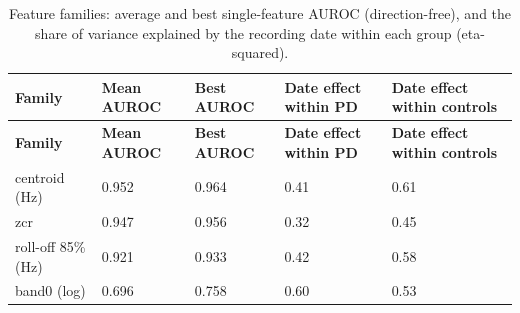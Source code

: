 \documentclass[11pt,a4paper]{article}
\begin{document}
\begin{center}\small\renewcommand{\arraystretch}{1.15}
\begin{longtable}{>{\raggedright\arraybackslash}p{2.88cm}>{\raggedleft\arraybackslash}p{2.88cm}>{\raggedleft\arraybackslash}p{2.88cm}>{\raggedleft\arraybackslash}p{2.88cm}>{\raggedleft\arraybackslash}p{2.88cm}}
\caption{Feature families: average and best single-feature AUROC (direction-free), and the share of variance explained by the recording date within each group (eta-squared).}\\
\toprule
\textbf{\hspace{0pt}Family} & \textbf{\hspace{0pt}Mean AUROC} & \textbf{\hspace{0pt}Best AUROC} & \textbf{\hspace{0pt}Date effect within PD} & \textbf{\hspace{0pt}Date effect within controls}\\\midrule\endfirsthead
\toprule
\textbf{\hspace{0pt}Family} & \textbf{\hspace{0pt}Mean AUROC} & \textbf{\hspace{0pt}Best AUROC} & \textbf{\hspace{0pt}Date effect within PD} & \textbf{\hspace{0pt}Date effect within controls}\\\midrule\endhead
\bottomrule\endfoot
\hspace{0pt}centroid (Hz) & \hspace{0pt}0.952 & \hspace{0pt}0.964 & \hspace{0pt}0.41 & \hspace{0pt}0.61\\
\hspace{0pt}zcr & \hspace{0pt}0.947 & \hspace{0pt}0.956 & \hspace{0pt}0.32 & \hspace{0pt}0.45\\
\hspace{0pt}roll-off 85\% (Hz) & \hspace{0pt}0.921 & \hspace{0pt}0.933 & \hspace{0pt}0.42 & \hspace{0pt}0.58\\
\hspace{0pt}band0 (log) & \hspace{0pt}0.696 & \hspace{0pt}0.758 & \hspace{0pt}0.60 & \hspace{0pt}0.53\\

\end{longtable}
\end{center}
\end{document}
